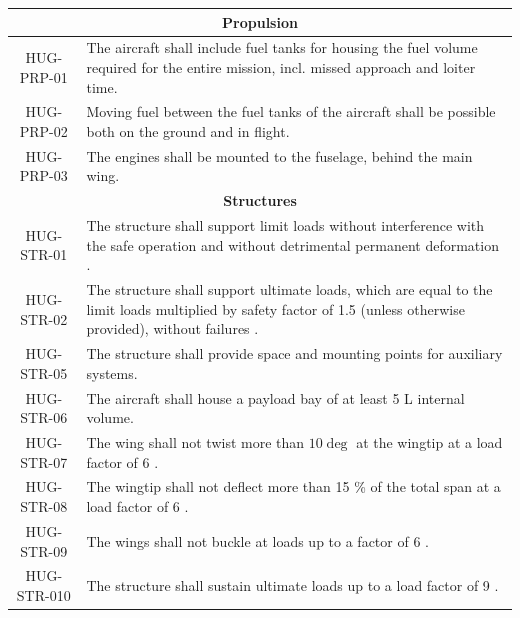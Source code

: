 \begin{longtable}{|c|p{13.5cm}|}
\multicolumn{2}{|c|}{\textbf{Propulsion}} \\\hline
HUG-PRP-01 & The aircraft shall include fuel tanks for housing the fuel volume required for the entire mission, incl. missed approach and loiter time. \\\hline
HUG-PRP-02 & Moving fuel between the fuel tanks of the aircraft shall be possible both on the ground and in flight. \\\hline
HUG-PRP-03 & The engines shall be mounted to the fuselage, behind the main wing. \\\hline

\multicolumn{2}{|c|}{\textbf{Structures}} \\\hline
HUG-STR-01 & The structure shall support limit loads without interference with the safe operation and without detrimental permanent deformation \cite{easa_light_uas_crd_is3}. \\\hline
HUG-STR-02 & The structure shall support ultimate loads, which are equal to the limit loads multiplied by safety factor of 1.5 (unless otherwise provided), without failures \cite{easa_light_uas_crd_is3}. \\\hline
HUG-STR-05 & The structure shall provide space and mounting points for auxiliary systems. \\\hline
HUG-STR-06 & The aircraft shall house a payload bay of at least 5 L internal volume. \\\hline
HUG-STR-07 & The wing shall not twist more than $10 \deg$ at the wingtip at a load factor of 6 \cite{easa_light_uas_crd_is3}.\\\hline
HUG-STR-08 & The wingtip shall not deflect more than 15 \% of the total span at a load factor of 6 \cite{easa_light_uas_crd_is3}. \\\hline
HUG-STR-09 & The wings shall not buckle at loads up to a factor of 6 \cite{easa_light_uas_crd_is3}.\\\hline
HUG-STR-010 & The structure shall sustain ultimate loads up to a load factor of 9 \cite{easa_light_uas_crd_is3}.\\\hline



\end{longtable}
